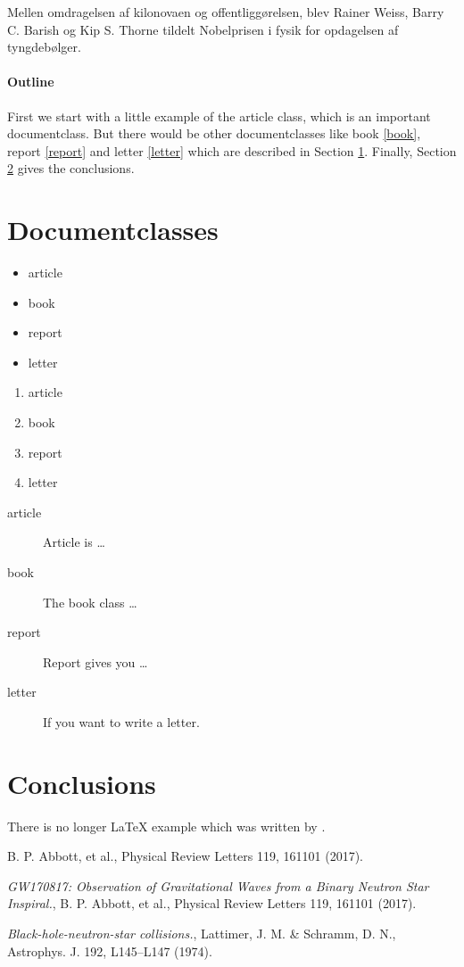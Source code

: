 \documentclass{article}
\begin{document}
Mellen omdragelsen af kilonovaen og offentliggørelsen, blev Rainer Weiss, Barry C. Barish og Kip S. Thorne tildelt Nobelprisen i fysik for opdagelsen af tyngdebølger. 






\paragraph{Outline}
First we start with a little example of the article class, which is an 
important documentclass. But there would be other documentclasses like 
book \ref{book}, report \ref{report} and letter \ref{letter} which are 
described in Section \ref{documentclasses}. Finally, Section 
\ref{conclusions} gives the conclusions.



\section{Documentclasses} \label{documentclasses}

\begin{itemize}
\item article
\item book 
\item report 
\item letter 
\end{itemize}


\begin{enumerate}
\item article
\item book 
\item report 
\item letter 
\end{enumerate}

\begin{description}
\item[article\label{article}]{Article is \ldots}
\item[book\label{book}]{The book class \ldots}
\item[report\label{report}]{Report gives you \ldots}
\item[letter\label{letter}]{If you want to write a letter.}
\end{description}


\section{Conclusions}\label{conclusions}
There is no longer \LaTeX{} example which was written by \cite{doe}.

B. P. Abbott, et al., Physical Review Letters 119, 161101 (2017).

\begin{thebibliography}{9}
 \emph{GW170817: Observation of Gravitational Waves from a Binary Neutron Star Inspiral.},
B. P. Abbott, et al., Physical Review Letters 119, 161101 (2017).

 \emph{Black-hole-neutron-star collisions.},
Lattimer, J. M. \& Schramm, D. N., Astrophys. J. 192, L145–L147 (1974).
\end{thebibliography}
\end{document}
